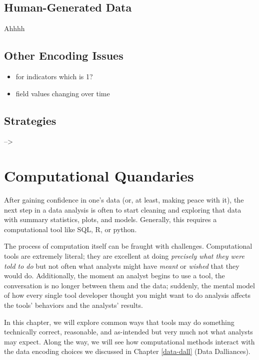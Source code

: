 \documentclass[
]{krantz}
\providecommand{\tightlist}{%
  \setlength{\itemsep}{0pt}\setlength{\parskip}{0pt}}
\begin{document}
\hypertarget{human-generated-data}{%
\section{Human-Generated Data}\label{human-generated-data}}

Ahhhh

\hypertarget{other-encoding-issues}{%
\section{Other Encoding Issues}\label{other-encoding-issues}}

\begin{itemize}
\tightlist
\item
  for indicators which is 1?
\item
  field values changing over time
\end{itemize}

\hypertarget{strategies}{%
\section{Strategies}\label{strategies}}

--\textgreater{}

\hypertarget{comp-quan}{%
\chapter{Computational Quandaries}\label{comp-quan}}

After gaining confidence in one's data (or, at least, making peace with it), the next step in a data analysis is often to start cleaning and exploring that data with summary statistics, plots, and models.
Generally, this requires a computational tool like SQL, R, or python.

The process of computation itself can be fraught with challenges.
Computational tools are extremely literal; they are excellent at doing \emph{precisely what they were told to do} but not often what analysts might have \emph{meant} or \emph{wished} that they would do.
Additionally, the moment an analyst begins to use a tool, the conversation is no longer between them and the data;
suddenly, the mental model of how every single tool developer thought you might want to do analysis affects the tools' behaviors and the analysts' results.

In this chapter, we will explore common ways that tools may do something technically correct, reasonable, and as-intended but very much not what analysts may expect.
Along the way, we will see how computational methods interact with the data encoding choices we discussed in Chapter \ref{data-dall} (Data Dalliances).
\end{document}
